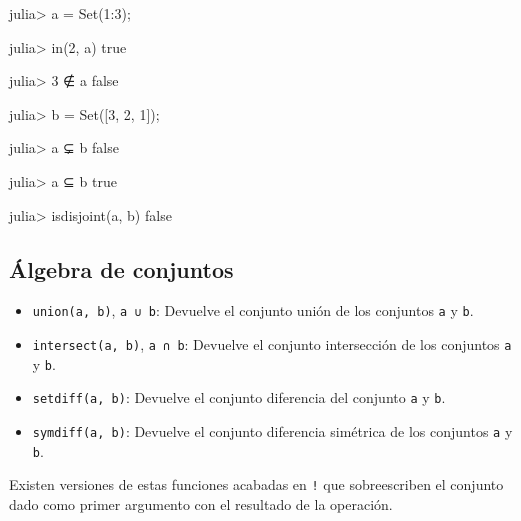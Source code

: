 \documentclass[
  letterpaper,
  DIV=11,
  numbers=noendperiod]{scrreprt}
\newenvironment{Shaded}{\begin{snugshade}}{\end{snugshade}}
\newcommand{\ConstantTok}[1]{\textcolor[rgb]{0.56,0.35,0.01}{#1}}
\newcommand{\FloatTok}[1]{\textcolor[rgb]{0.68,0.00,0.00}{#1}}
\newcommand{\FunctionTok}[1]{\textcolor[rgb]{0.28,0.35,0.67}{#1}}
\newcommand{\NormalTok}[1]{\textcolor[rgb]{0.00,0.23,0.31}{#1}}
\newcommand{\OperatorTok}[1]{\textcolor[rgb]{0.37,0.37,0.37}{#1}}
\providecommand{\tightlist}{%
  \setlength{\itemsep}{0pt}\setlength{\parskip}{0pt}}\usepackage{longtable,booktabs,array}
\begin{document}
\begin{Shaded}
\begin{Highlighting}[]
\NormalTok{julia}\OperatorTok{\textgreater{}}\NormalTok{ a }\OperatorTok{=} \FunctionTok{Set}\NormalTok{(}\FloatTok{1}\OperatorTok{:}\FloatTok{3}\NormalTok{);}

\NormalTok{julia}\OperatorTok{\textgreater{}} \FunctionTok{in}\NormalTok{(}\FloatTok{2}\NormalTok{, a)}
\ConstantTok{true}

\NormalTok{julia}\OperatorTok{\textgreater{}} \FloatTok{3} \OperatorTok{∉}\NormalTok{ a}
\ConstantTok{false}

\NormalTok{julia}\OperatorTok{\textgreater{}}\NormalTok{ b }\OperatorTok{=} \FunctionTok{Set}\NormalTok{([}\FloatTok{3}\NormalTok{, }\FloatTok{2}\NormalTok{, }\FloatTok{1}\NormalTok{]);}

\NormalTok{julia}\OperatorTok{\textgreater{}}\NormalTok{ a }\OperatorTok{⊊}\NormalTok{ b}
\ConstantTok{false}

\NormalTok{julia}\OperatorTok{\textgreater{}}\NormalTok{ a }\OperatorTok{⊆}\NormalTok{ b}
\ConstantTok{true}

\NormalTok{julia}\OperatorTok{\textgreater{}} \FunctionTok{isdisjoint}\NormalTok{(a, b)}
\ConstantTok{false}
\end{Highlighting}
\end{Shaded}

\hypertarget{uxe1lgebra-de-conjuntos}{%
\subsection{Álgebra de conjuntos}\label{uxe1lgebra-de-conjuntos}}

\begin{itemize}
\tightlist
\item
  \texttt{union(a,\ b)}, \texttt{a\ ∪\ b}: Devuelve el conjunto unión de
  los conjuntos \texttt{a} y \texttt{b}.
\item
  \texttt{intersect(a,\ b)}, \texttt{a\ ∩\ b}: Devuelve el conjunto
  intersección de los conjuntos \texttt{a} y \texttt{b}.
\item
  \texttt{setdiff(a,\ b)}: Devuelve el conjunto diferencia del conjunto
  \texttt{a} y \texttt{b}.
\item
  \texttt{symdiff(a,\ b)}: Devuelve el conjunto diferencia simétrica de
  los conjuntos \texttt{a} y \texttt{b}.
\end{itemize}

Existen versiones de estas funciones acabadas en \texttt{!} que
sobreescriben el conjunto dado como primer argumento con el resultado de
la operación.
\end{document}
